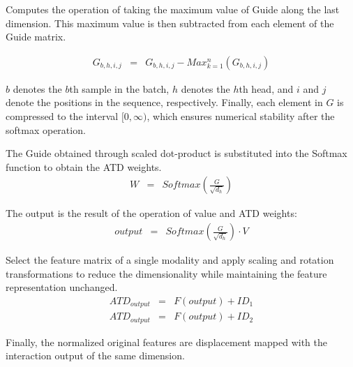 \documentclass{ecai}
\begin{document}
Computes the operation of taking the maximum value of Guide along the last dimension. This maximum value is then subtracted from each element of the Guide matrix.

\begin{eqnarray}
G_{b,h,i,j} & = & G_{b,h,i,j}-Max_{k=1}^n \left(G_{b,h,i,j}\right) 
\end{eqnarray}

$ b $ denotes the $ b $th sample in the batch, $h$ denotes the $ h $th head, and $ i $ and $ j $ denote the positions in the sequence, respectively. Finally, each element in $ G $ is compressed to the interval $[0, \infty)$, which ensures numerical stability after the softmax operation.


The Guide obtained through scaled dot-product is substituted into the Softmax function to obtain the ATD weights.
\begin{eqnarray}
 W & = & Softmax(\frac{G}{\sqrt{d_h}})
\end{eqnarray}

The output is the result of the operation of value and  ATD weights:
\begin{eqnarray}
 output & = & Softmax(\frac{G}{\sqrt{d_h}})\cdot V
\end{eqnarray}


Select the feature matrix of a single modality and apply scaling and rotation transformations to reduce the dimensionality while maintaining the feature representation unchanged.
\begin{eqnarray}
 ATD_{output} & = & F(output)+ID_1\\
 ATD_{output} & = & F(output)+ID_2
\end{eqnarray}


Finally, the normalized original features are displacement mapped with the interaction output of the same dimension.
\end{document}
